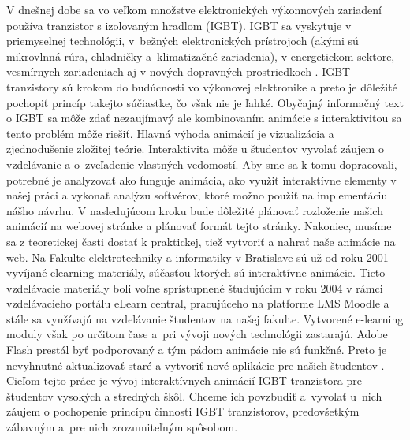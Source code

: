 V dnešnej dobe sa vo veľkom množstve elektronických výkonnových zariadení používa tranzistor s izolovaným hradlom (\acrshort{IGBT}). IGBT sa vyskytuje v priemyselnej technológii, v bežných elektronických prístrojoch (akými sú mikrovlnná rúra, chladničky a klimatizačné zariadenia), v energetickom sektore, vesmírnych zariadeniach aj v nových dopravných prostriedkoch \cite{c12}.
\newline IGBT tranzistory sú krokom do budúcnosti vo výkonovej elektronike a preto je dôležité pochopiť princíp takejto súčiastke, čo však nie je ľahké. Obyčajný informačný text o IGBT sa môže zdať nezaujímavý ale kombinovaním animácie s interaktivitou sa tento problém môže riešiť. Hlavná výhoda animácií je vizualizácia a zjednodušenie zložitej teórie. Interaktivita môže u študentov vyvolať  záujem o vzdelávanie a o zveľadenie vlastných vedomostí. Aby sme sa k tomu dopracovali, potrebné je analyzovať ako funguje animácia, ako využiť interaktívne elementy v našej práci a vykonať analýzu softvérov, ktoré možno použiť na implementáciu nášho návrhu. V nasledujúcom kroku bude dôležité plánovať rozloženie našich animácií na webovej stránke a plánovať formát tejto stránky. Nakoniec,  musíme sa z teoretickej časti dostať k praktickej, tiež  vytvoriť a nahrať naše animácie na web.
\newline Na Fakulte elektrotechniky a informatiky v Bratislave sú už od roku 2001 vyvíjané elearning materiály, súčasťou ktorých sú interaktívne animácie. Tieto vzdelávacie materiály boli voľne sprístupnené študujúcim v roku 2004 v rámci vzdelávacieho portálu eLearn central, pracujúceho na platforme LMS Moodle a stále sa využívajú na vzdelávanie študentov na našej fakulte. Vytvorené e-learning moduly však po určitom čase a pri vývoji nových technológii zastarajú. Adobe Flash prestál byť podporovaný a tým pádom animácie nie sú funkčné. Preto je nevyhnutné aktualizovať staré a vytvoriť nové aplikácie pre našich študentov \cite{c13}.
\newline Cieľom tejto práce je vývoj interaktívnych animácií IGBT tranzistora pre študentov  vysokých a stredných škôl. Chceme ich povzbudiť a vyvolať u nich  záujem o pochopenie princípu činnosti IGBT tranzistorov, predovšetkým zábavným a pre nich zrozumiteľným spôsobom.